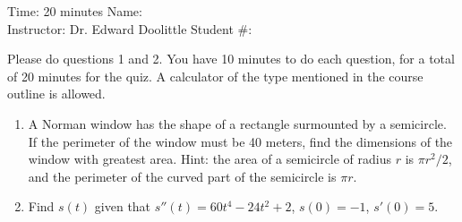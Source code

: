 \documentclass[12pt]{article}
\newcommand{\ds}{\displaystyle}
\begin{document}
\thispagestyle{plain}

\begin{flushleft}
Time:  20 minutes                \hfill       Name: \underline{\hspace{2in}} \\
Instructor: Dr. Edward Doolittle \hfill Student \#: \underline{\hspace{2in}}
\end{flushleft}

\noindent
Please do questions 1 and 2.  You have 10 minutes to do each question, for a total of 20
minutes for the quiz.  A %
calculator of the type mentioned in the course outline is allowed.

\begin{enumerate}
\item A
  Norman window has the shape of a rectangle surmounted by a semicircle.
  If the perimeter of the window must be 40 meters, find the dimensions of
  the window with greatest area.  Hint: the area of a semicircle of radius
  $r$ is $\pi r^2/2$, and the perimeter of the curved part of the 
  semicircle is $\pi r$.
  \\
\vfill
\newpage
\item Find 
  $\ds s(t)$ given that $\ds s''(t)=60t^4-24t^2+2$, $\ds s(0)=-1$, $\ds s'(0)=5$.
\end{enumerate}
\end{document}
